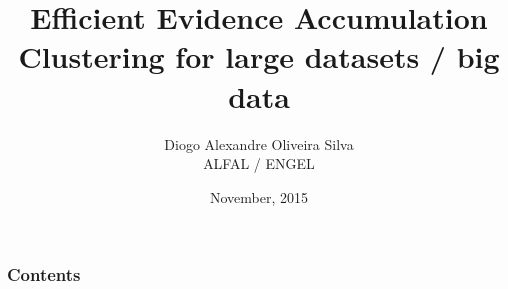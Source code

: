\documentclass{beamer}					%
\title[Thesis presentation]{Efficient Evidence Accumulation Clustering for large datasets / big data}
\author[Silva]{Diogo Alexandre Oliveira Silva \\ \tiny ALFAL / ENGEL}
\institute[AFA/IST]{
Academia da For\c{c}a A\'erea / Instituto Superior T\'ecnico \\
}
\date{November, 2015}
\begin{document}
\begin{frame}[plain]






\titlepage

\end{frame}


\begin{frame}
\frametitle{Contents} %
\footnotesize \tableofcontents %
\end{frame}

          







\bgroup
{}
\begin{frame}[plain]{}
\end{frame}
\egroup
\end{document}

